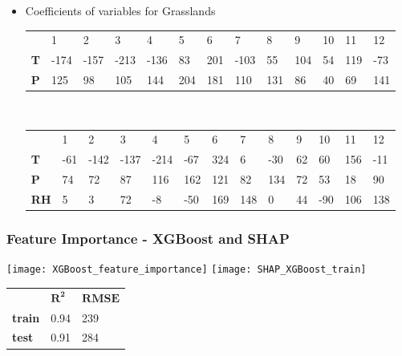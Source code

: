 \documentclass[serif, xcolor={dvipsnames}]{beamer} %
\begin{document}
\begin{frame}
\begin{itemize}
\item Coefficients of variables for Grasslands 
\begin{table}[!ht]
\captionsetup{singlelinecheck=false, format=hang}
\label{tab:regressionCoeffs}
\hspace{-.53in}
\begin{tabular}{lllllllllllll}
\bottomrule
\rowcolor{shadecolor} &  1 & 2 & 3 & 4 & 5 & 6 & 7 & 8 & 9 & 10 & 11 & 12  \\ 
{\bf T} & \tiny{-174} &  \tiny{-157} &  \tiny{-213} &  \tiny{-136} &  \tiny{83} &  \tiny{201} &  \tiny{-103} &  \tiny{55} &  \tiny{104} &  \tiny{54} &  \tiny{119} & \tiny{-73} \\
{\bf P} &   \tiny{125} &  \tiny{98} &  \tiny{105} &  \tiny{144} &  \tiny{204} &  \tiny{181} &  \tiny{110} &  \tiny{131} &  \tiny{86} &  \tiny{40} & \tiny{ 69} &  \tiny{141} \\
\toprule
\end{tabular}\\
\hspace*{-.5in}
\begin{tabular}{lllllllllllll}
\bottomrule
\rowcolor{shadecolor} &  1 & 2 & 3 & 4 & 5 & 6 & 7 & 8 & 9 & 10 & 11 & 12  \\ 
{\bf T}    & \tiny{-61} & \tiny{-142} & \tiny{-137} & \tiny{-214} & \tiny{-67} & \tiny{324} & \tiny{6} & \tiny{-30} & \tiny{62} & \tiny{60} & \tiny{156} & \tiny{-11}\\
{\bf P}    & \tiny{74} & \tiny{72} & \tiny{87} & \tiny{116} & \tiny{162} & \tiny{121} & \tiny{82} & \tiny{134} & \tiny{72} & \tiny{53} & \tiny{18} & \tiny{90} \\ 
{\bf RH} &  \tiny{5} & \tiny{3} & \tiny{72} & \tiny{-8} & \tiny{-50} & \tiny{169} & \tiny{148} & \tiny{0} & \tiny{44} & \tiny{-90} & \tiny{106}  & \tiny{138} \\ 
\toprule
\end{tabular}
\end{table}
\end{itemize}
\end{frame}

\begin{frame}
\frametitle{Feature Importance - XGBoost and SHAP}
\hspace{.2in}
\texttt{[image: XGBoost\_feature\_importance]}
\texttt{[image: SHAP\_XGBoost\_train]}
\begin{table}[!ht]
\label{tab:XGBErrMetrics}
\begin{tabular}{lll}
\bottomrule
\cellcolor{palecornflowerblue}{\tiny f(T, P)} &  \tiny{$\mathbf{R^2}$} & \tiny{$\mathbf{RMSE}$}  \\ 
\rowcolor{shadecolor} 
\tiny{\bf train}   &  \tiny{0.94}  &  \tiny{239}\\ 
 \tiny{\bf test}  & \tiny{0.91}  & \tiny{284}\\
\toprule
\end{tabular}\qquad
\end{table}
\end{frame}
\end{document}
